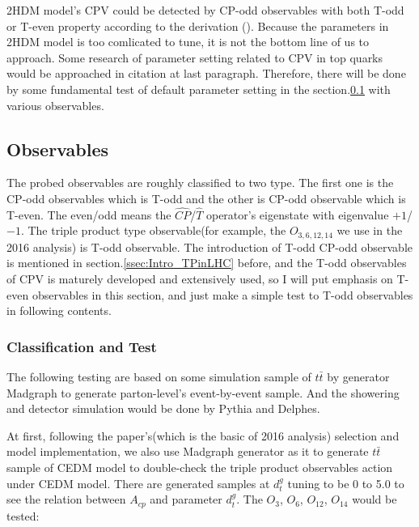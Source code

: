 			2HDM model's CPV could be detected by CP-odd observables with both T-odd or T-even property according to the derivation (\cite{Bernreuther:1993hq}). Because the parameters in 2HDM model is too comlicated to tune, it is not the bottom line of us to approach. Some research of parameter setting related to CPV in top quarks would be approached in citation at last paragraph. Therefore, there will be done by some fundamental test of default parameter setting in the section.\ref{ssec:AcpObs} with various observables.



	\subsection{Observables}
	\label{ssec:AcpObs}

		The probed observables are roughly classified to two type. The first one is the CP-odd observables which is T-odd and the other is CP-odd observable which is T-even. The even/odd means the $\hat{CP}$/$\hat{T}$ operator's eigenstate with eigenvalue $+1$/$-1$. The triple product type observable(for example, the $O_{3,6,12,14}$ we use in the 2016 analysis) is T-odd observable. The introduction of T-odd CP-odd observable is mentioned in section.\ref{ssec:Intro_TPinLHC} before, and the T-odd observables of CPV is maturely developed and extensively used, so I will put emphasis on T-even observables in this section, and just make a simple test to T-odd observables in following contents.

		\subsubsection{Classification and Test}
		\label{sssec:AcpObs_class_test}

			The following testing are based on some simulation sample of $t\bar{t}$ by generator Madgraph to generate parton-level's event-by-event sample. And the showering and detector simulation would be done by Pythia\cite{Sjostrand:2014zea} and Delphes\cite{Ovyn:2009tx}.

			At first, following the paper\cite{Hayreter:2015ryk}'s(which is the basic of 2016 analysis) selection and model implementation, we also use Madgraph\cite{Alwall:2011uj} generator as it to generate $t\bar{t}$ sample of CEDM model to double-check the triple product observables action under CEDM model. There are generated samples at $d_t^g$ tuning to be 0 to 5.0 to see the relation between $A_{cp}$ and parameter $d_t^g$. The $O_{3}$, $O_{6}$, $O_{12}$, $O_{14}$ would be tested:

